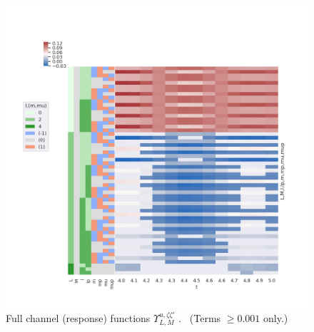 \documentclass[10pt]{article}
\begin{document}
\begin{figure}[]
\begin{center}
\includegraphics[width=\textwidth,height=\dimexpr\textheight-4\baselineskip-\abovecaptionskip-\belowcaptionskip\relax,keepaspectratio]{figures/basisPlots_090822_response_M0.png}
\caption{Full channel (response) functions \(\varUpsilon_{L,M}^{u,\zeta\zeta'}\) .     (Terms \(\ge0.001\) only.)\label{676540}}
\end{center}
\end{figure}








\end{document}
